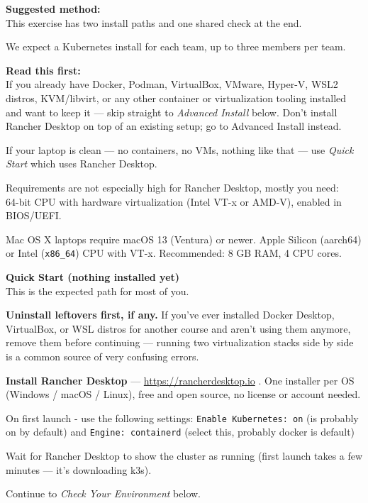 \documentclass[a4paper,11pt,notitlepage]{report}
\begin{document}
{\bf Suggested method:}\\
This exercise has two install paths and one shared check at the end.

We expect a Kubernetes install for each team, up to three members per team.

{\bf Read this first:}\\
If you already have Docker, Podman, VirtualBox, VMware, Hyper-V, WSL2 distros, KVM/libvirt, or any other container or virtualization tooling installed and want to keep it --- skip straight to \emph{Advanced Install} below. Don't install Rancher Desktop on top of an existing setup; go to Advanced Install instead.

If your laptop is clean --- no containers, no VMs, nothing like that --- use \emph{Quick Start} which uses Rancher Desktop.

Requirements are not especially high for Rancher Desktop, mostly you need:\\
64-bit CPU with hardware virtualization (Intel VT-x or AMD-V), enabled in BIOS/UEFI.

Mac OS X laptops require macOS 13 (Ventura) or newer. Apple Silicon (aarch64) or Intel (\verb+x86_64+) CPU with VT-x. Recommended: 8 GB RAM, 4 CPU cores.


{\bf Quick Start (nothing installed yet)}\\
This is the expected path for most of you.

\begin{list2}
\item[1.] {\bf Uninstall leftovers first, if any.} If you've ever installed Docker Desktop, VirtualBox, or WSL distros for another course and aren't using them anymore, remove them before continuing --- running two virtualization stacks side by side is a common source of very confusing errors.
\item[2.] {\bf Install Rancher Desktop} --- \url{https://rancherdesktop.io} . One installer per OS (Windows / macOS / Linux), free and open source, no license or account needed.
\item[3.] On first launch - use the following settings:
   \verb+Enable Kubernetes: on+   (is probably on by default) and
   \verb+Engine: containerd+      (select this, probably docker is default)
\item[4.] Wait for Rancher Desktop to show the cluster as running (first launch takes a few minutes --- it's downloading k3s).
\item[5.] Continue to \emph{Check Your Environment} below.
\end{list2}
\end{document}
